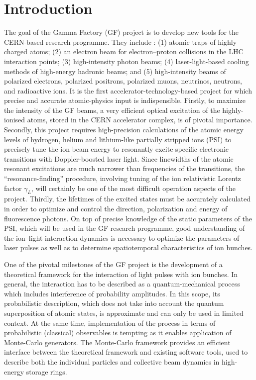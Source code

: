 \documentclass[superscriptaddress,
amsmath,amssymb%
pra,twocolumn,
floatfix
]{revtex4-2}
\begin{document}
\section{Introduction}
\label{sec:Intro}

The goal of the Gamma Factory (GF) project \cite{Krasny:2015ffb} is to develop new tools for the CERN-based research programme.  They include  \cite{GF-PoP-LoI:2019,Placzek:2019xpw,GammaFactoryWorkingGroup:2020ely,Budker:2020zer,Krasny:2021llv,Budker:2021fts,Nichita:2021iwa}: (1) atomic traps of highly charged atoms; (2) an electron beam for electron--proton collisions in the LHC interaction points; (3) high-intensity photon beams; (4) laser-light-based cooling methods of high-energy hadronic beams; and (5) high-intensity beams of polarized electrons, polarized positrons, polarized muons,  neutrinos, neutrons, and radioactive ions.  It is the first accelerator-technology-based project for which precise and accurate atomic-physics input is indispensible.  Firstly, to maximize the intensity of the GF beams, a very efficient optical excitation of the highly-ionised atoms, stored in the CERN accelerator complex, is of pivotal importance.  Secondly, this project requires high-precision calculations of the atomic energy levels of hydrogen, helium and lithium-like partially stripped ions (PSI) to precisely tune the ion beam energy to resonantly excite specific electronic transitions with Doppler-boosted laser light.  Since linewidths of the atomic resonant excitations are much narrower than frequencies of the transitions, the ``resonance-finding'' procedure, involving tuning of the ion relativistic Lorentz factor $\gamma_{L}$,  will certainly be one of the most difficult operation aspects of the project.  Thirdly, the lifetimes of the excited states must be accurately calculated in order to optimize and control the direction, polarization and energy of fluorescence photons. 
On top of precise knowledge of the static parameters of the PSI, which will be used in the GF research programme, good understanding of the ion--light interaction dynamics is necessary to optimize the parameters of laser pulses as well as to determine spatiotemporal characteristics of ion bunches.

One of the pivotal milestones of the GF project is the development of a theoretical framework for the interaction of light pulses with ion bunches.  In general, the interaction has to be described as a quantum-mechanical process which includes interference of probability amplitudes.  In this scope, its probabilistic description, which does not take into account the quantum superposition of atomic states, is approximate and can only be used in limited context.  At the same time, implementation of the process in terms of probabilistic (classical) observables is tempting as it enables application of Monte-Carlo generators. The Monte-Carlo framework provides an efficient interface between the theoretical framework and existing software tools, used to describe both the individual particles and collective beam dynamics in high-energy storage rings. 
\end{document}
